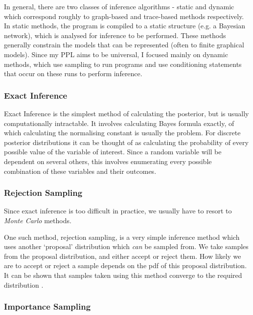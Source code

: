 In general, there are two classes of inference algorithms - static and dynamic \cite{gordon2014probabilistic} which correspond roughly to graph-based and trace-based methods respectively. In static methods, the program is compiled to a static structure (e.g. a Bayesian network), which is analysed for inference to be performed. These methods generally constrain the models that can be represented (often to finite graphical models). Since my PPL aims to be universal, I focused mainly on dynamic methods, which use sampling to run programs and use conditioning statements that occur on these runs to perform inference.

\subsubsection{Exact Inference}

Exact Inference is the simplest method of calculating the posterior, but is usually computationally intractable. It involves calculating Bayes formula exactly, of which calculating the normalising constant is usually the problem. For discrete posterior distributions it can be thought of as calculating the probability of every possible value of the variable of interest. Since a random variable will be dependent on several others, this involves enumerating every possible combination of these variables and their outcomes.

\subsubsection{Rejection Sampling}
			
Since exact inference is too difficult in practice, we usually have to resort to \textit{Monte Carlo} \cite{monte-carlo} methods.
		
One such method, rejection sampling, is a very simple inference method which uses another `proposal' distribution which \textit{can} be sampled from. We take samples from the proposal distribution, and either accept or reject them. How likely we are to accept or reject a sample depends on the pdf of this proposal distribution. It can be shown that samples taken using this method converge to the required distribution \cite{flury1990acceptance}. 
		
\subsubsection{Importance Sampling}
		
